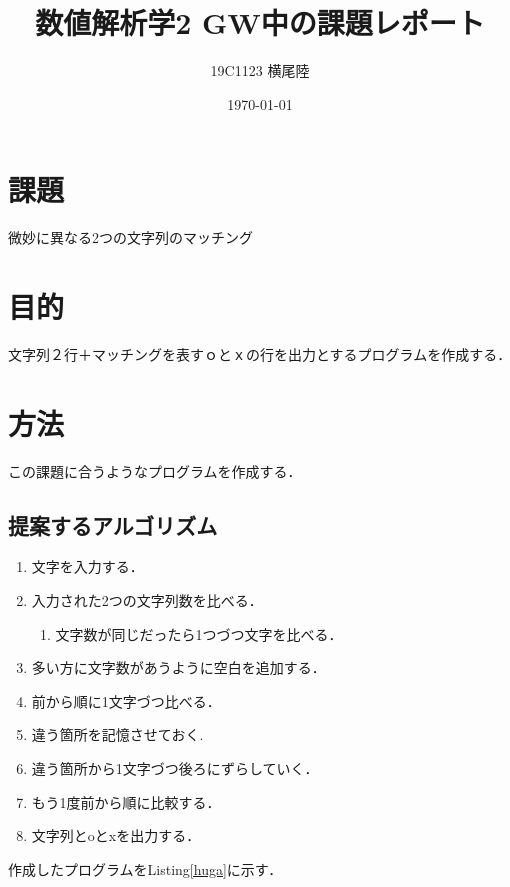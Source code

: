 \documentclass[dvipdfmx]{jsarticle}
\begin{document}
\title{数値解析学2 GW中の課題レポート}
\author{19C1123 横尾陸}
\date{\today}
\maketitle

\section*{課題}
微妙に異なる2つの文字列のマッチング
\section{目的}
文字列２行＋マッチングを表すｏとｘの行を出力とするプログラムを作成する．
\section{方法}
この課題に合うようなプログラムを作成する．
  \subsection{提案するアルゴリズム}
\begin{enumerate}
  \item 文字を入力する．
  \item 入力された2つの文字列数を比べる．
  \begin{enumerate}
    \item 文字数が同じだったら1つづつ文字を比べる．
  \end{enumerate}
  \item 多い方に文字数があうように空白を追加する．
  \item 前から順に1文字づつ比べる．
  \item 違う箇所を記憶させておく.
  \item 違う箇所から1文字づつ後ろにずらしていく．
  \item もう1度前から順に比較する．
  \item 文字列とoとxを出力する．
\end{enumerate}
作成したプログラムをListing\ref{huga}に示す．
\end{document}

